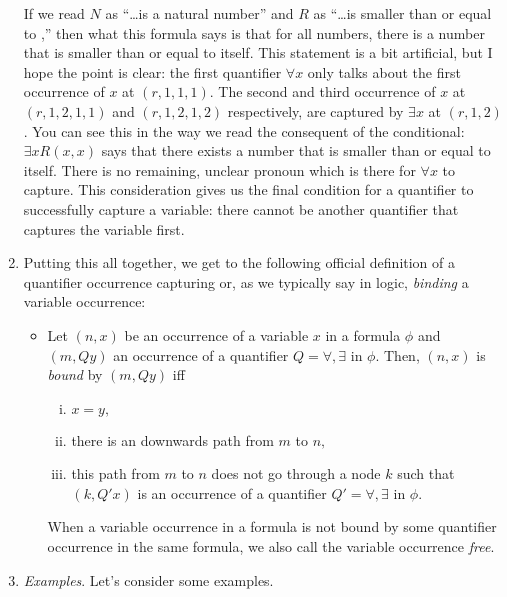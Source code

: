 \begin{enumerate}[\thesection.1]
	
	 If we read $N$ as ``\dots is a natural number'' and $R$ as ``\dots is smaller than or equal to \underline{\phantom{\dots}},'' then what this formula says is that for all numbers, there is a number that is smaller than or equal to itself. This statement is a bit artificial, but I hope the point is clear: the first quantifier $\forall x$ only talks about the first occurrence of $x$ at $(r,1,1,1)$. The second and third occurrence of $x$ at $(r,1,2,1,1)$ and  $(r,1,2,1,2)$ respectively, are captured by $\exists x$ at $(r,1,2)$. You can see this in the way we read the consequent of the conditional: $\exists x R(x,x)$ says that there exists a number that is smaller than or equal to itself. There is no remaining, unclear pronoun which is there for $\forall x$ to capture. This consideration gives us the final condition for a quantifier to successfully capture a variable: there cannot be another quantifier that captures the variable first. 
	
	\item Putting this all together, we get to the following official definition of a quantifier occurrence capturing or, as we typically say in logic, \emph{binding} a variable occurrence:
	
	\begin{itemize}
		
		\item Let $( n, x)$ be an occurrence of a variable $x$ in a formula $\phi$ and $( m, Qy)$ an occurrence of a quantifier $Q=\forall,\exists$ in $\phi$. Then, $( n, x)$ is {\it bound} by  $( m, Qy)$ iff
\begin{enumerate}[(i)]
\item $x=y,$
\item there is an downwards path from $m$ to $n,$
\item this path from $m$ to $n$ does not go through a node $k$ such that $( k, Q'x)$ is an occurrence of a quantifier $Q'=\forall,\exists$ in $\phi$.

\end{enumerate}
When a variable occurrence in a formula is not bound by some quantifier occurrence in the same formula, we also call the variable occurrence \emph{free}.

	\end{itemize}
	
	\item \emph{Examples}. Let's consider some examples.
	
		\begin{enumerate}[(i)]
		

\end{enumerate}
\end{enumerate}
